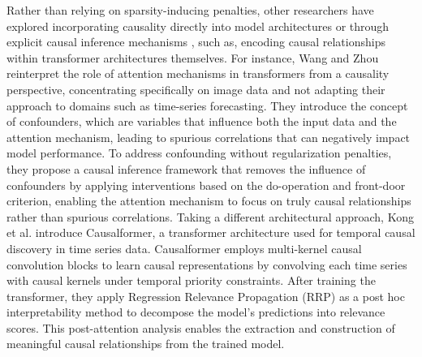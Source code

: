 \documentclass[acmsmall]{acmart}
\begin{document}
{\color{black}Rather than relying on sparsity-inducing penalties, other researchers have explored incorporating causality directly into model architectures \cite{kong2024causalformer} or through explicit causal inference mechanisms \cite{wang2024rethinking}, such as, encoding causal relationships within transformer architectures themselves}.
For instance, Wang and Zhou \cite{wang2024rethinking} reinterpret the role of attention mechanisms in transformers from a causality perspective, concentrating specifically on image data and not adapting their approach to domains such as time-series forecasting. They introduce the concept of confounders, which are variables that influence both the input data and the attention mechanism, leading to spurious correlations that can negatively impact model performance. {\color{black}To address confounding without regularization penalties,} they propose a causal inference framework that removes the influence of confounders by applying interventions based on the do-operation and front-door criterion, enabling the attention mechanism to focus on truly causal relationships rather than spurious correlations. {\color{black}Taking a different architectural approach,} Kong et al. \cite{kong2024causalformer} introduce Causalformer, a transformer architecture used for temporal causal discovery in time series data. Causalformer employs multi-kernel causal convolution blocks to learn causal representations by convolving each time series with causal kernels under temporal priority constraints. After training the transformer, they apply Regression Relevance Propagation (RRP) as a post hoc interpretability method to decompose the model’s predictions into relevance scores. This post-attention analysis enables the extraction and construction of meaningful causal relationships from the trained model. 
\end{document}
